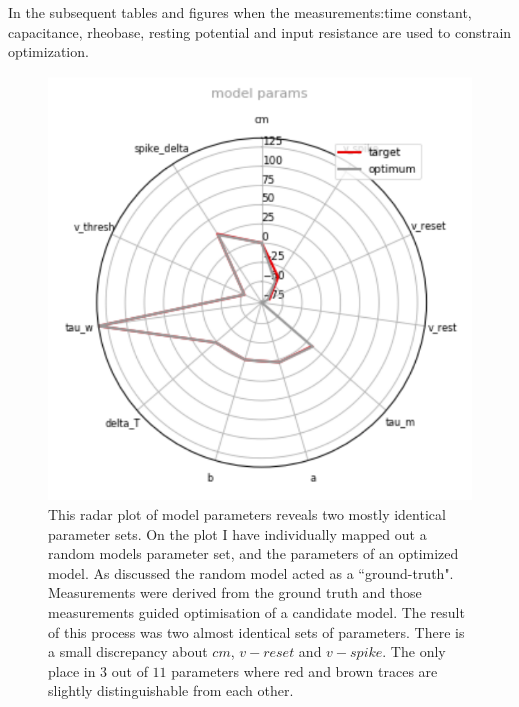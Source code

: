 In the subsequent tables and figures when the measurements:time constant, capacitance, rheobase, resting potential and input resistance are used to constrain optimization.
\begin{figure}
    \centering
    \includegraphics[scale=0.75]{figures/radar_coordinates.png}
    \caption{This radar plot of model parameters reveals two mostly identical parameter sets.
    On the plot I have individually mapped out a random models parameter set, and the parameters of an optimized model.
    As discussed the random model acted as a ``ground-truth". 
    Measurements were derived from the ground truth and those measurements guided optimisation of a candidate model.
    The result of this process was two almost identical sets of parameters.
    There is a small discrepancy about $cm$, $v-reset$ and $v-spike$.
    The only place in $3$ out of $11$ parameters where red and brown traces are slightly distinguishable from each other.
    }
    \label{fig:my_label}
\end{figure}

